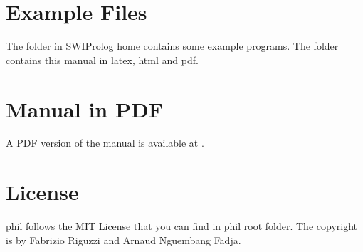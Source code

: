 \documentclass[letterpaper,10pt,english]{sphinxmanual}
\begin{document}
\chapter{Example Files}
\label{\detokenize{index:example-files}}
\sphinxAtStartPar
The  folder in SWI\sphinxhyphen{}Prolog home contains some example programs.
The  folder contains this manual in latex, html and pdf.


\chapter{Manual in PDF}
\label{\detokenize{index:manual-in-pdf}}
\sphinxAtStartPar
A PDF version of the manual is available at .


\chapter{License}
\label{\detokenize{index:license}}
\sphinxAtStartPar
phil follows the MIT License that you can find in phil root folder.
The copyright is by Fabrizio Riguzzi and Arnaud Nguembang Fadja.

\sphinxAtStartPar
\end{document}
